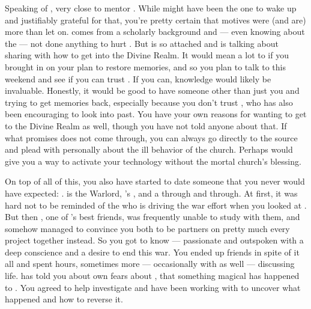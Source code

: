 \documentclass[char]{GL2020}
\begin{document}
Speaking of \cDisney{}, \cDisney{\theyare} very close to \cDisney{\their} mentor \cWildCard{\intro}. While \cWildCard{} might have been the one to wake \cDisney{} up and \cDisney{\theyare} justifiably grateful for that, you're pretty certain that \cWildCard{\their} motives were (and are) more than \cWildCard{\they} let\cWildCard{\verbs} on.  \cWildCard{} comes from a scholarly background and — even knowing about the \cDisneySect{} — \cWildCard{\theyhave} not done anything to hurt \cDisney{}. But \cDisney{} is so attached and is talking about sharing with \cWildCard{} how to get into the Divine Realm. It would mean a lot to \cDisney{} if you brought \cWildCard{} in on your plan to restore \cDisney{\their} memories, and so you plan to talk to \cWildCard{\them} this weekend and see if you can trust \cWildCard{\them}. If you can, \cWildCard{\their} knowledge would likely be invaluable. Honestly, it would be good to have someone other than just you and \cDisney{} trying to get \cDisney{\their} memories back, especially because you don’t trust \cPirateChild{}, who has also been encouraging \cDisney{} to look into \cDisney{\their} past. You have your own reasons for wanting to get to the Divine Realm as well, though you have not told anyone about that. If what \cChupInventor{} promises does not come through, you can always go directly to the source and plead with \cTechGod{} personally about the ill behavior of the church. Perhaps \cTechGod{} would give you a way to activate your technology without the mortal church’s blessing.

On top of all of this, you also have started to date someone that you never would have expected: \cWarlordDaughter{\intro}. \cWarlordDaughter{} is the \pShippie{} Warlord, \cLoud{\intro}'s \cWarlordDaughter{\offspring}, and a \pShippie{} through and through. At first, it was hard not to be reminded of the \cLoud{\person} who is driving the war effort when you looked at \cWarlordDaughter{\them}. But then \cInitiate{\intro}, one of \cWarlordDaughter{}’s best friends, was frequently unable to study with them, and somehow managed to convince you both to be partners on pretty much every project together instead. So you got to know \cWarlordDaughter{} — passionate and outspoken with a deep conscience and a desire to end this war. You ended up friends in spite of it all and spent hours, sometimes more — occasionally with \cScholarship{} as well — discussing life.  \cWarlordDaughter{} has told you about \cWarlordDaughter{\their} own fears about \cWarlordDaughter{\their} \cLoud{\parent}, that something magical has happened to \cLoud{\them}. You agreed to help investigate and have been working with \cWarlordDaughter{\them} to uncover what happened and how to reverse it. 
\end{document}

